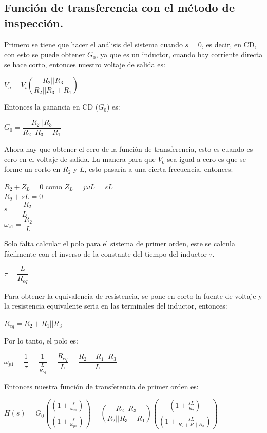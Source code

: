 \documentclass[12pt,a4paper]{article}
\newcounter{ns}
\begin{document}
\subsection{Función de transferencia con el método de inspección.}
Primero se tiene que hacer el análisis del sistema cuando $s = 0$, es decir, en CD, con esto se puede obtener $G_{0}$, ya que es un inductor, cuando hay corriente directa se hace corto, entonces nuestro voltaje de salida es:\\
\begin{center}
$V_{o} = V_{i}\left(\dfrac{R_{2}||R_{3}}{R_{2}||R_{3}+R_{1}}\right)$
\end{center}
Entonces la ganancia en CD ($G_{0}$) es:\\
\begin{center}
$G_{0}=\dfrac{R_{2}||R_{3}}{R_{2}||R_{3}+R_{1}}$
\end{center}
Ahora hay que obtener el cero de la función de transferencia, esto es cuando es cero en el voltaje de salida. La manera para que $V_{o}$ sea igual a cero es que se forme un corto en $R_{2}$ y $L$, esto pasaría a una cierta frecuencia, entonces:\\
\begin{center}
$R_{2} + Z_{L} = 0$ como $Z_{L} = j\omega L = sL$\\[12pt]
$R_{2} + sL = 0$\\[12pt]
$s = \dfrac{-R_{2}}{L}$\\[12pt]
$\omega_{z1} = \dfrac{R_{2}}{L}$
\end{center}
Solo falta calcular el polo para el sistema de primer orden, este se calcula fácilmente con el inverso de la constante del tiempo del inductor $\tau$.\\
\begin{center}
$\tau = \dfrac{L}{R_{eq}}$
\end{center}
Para obtener la equivalencia de resistencia, se pone en corto la fuente de voltaje y la resistencia equivalente seria en las terminales del inductor, entonces:\\
\begin{center}
$R_{eq}=R_{2} + R_{1}||R_{3}$
\end{center}
Por lo tanto, el polo es:
\begin{center}
$\omega_{p1} = \dfrac{1}{\tau} = \dfrac{1}{\frac{L}{R_{eq}}} = \dfrac{R_{eq}}{L} = \dfrac{R_{2} + R_{1}||R_{3}}{L}$
\end{center}
Entonces nuestra función de transferencia de primer orden es:
\begin{center}
$H(s)=  G_{0}\left(\dfrac{(1+\frac{s}{\omega_{z1}})}{(1+\frac{s}{\omega_{p1}})}\right)= \left(\dfrac{R_{2}||R_{3}}{R_{2}||R_{3}+R_{1}}\right)\left(\dfrac{(1+\frac{sL}{R_{2}})}{(1+\frac{sL}{R_{2} + R_{1}||R_{3}})}\right)$
\end{center}
\end{document}
